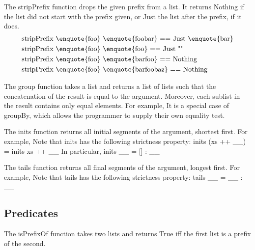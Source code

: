 \eqCode
\label{haskellBreak}


The stripPrefix function drops the given prefix from a list. It returns Nothing if the list did not start with the prefix given, or Just the list after the prefix, if it does.
\begin{align*}
	&\text{stripPrefix \enquote{foo} \enquote{foobar} == Just \enquote{bar}}\\
	&\text{stripPrefix \enquote{foo} \enquote{foo} == Just ""}\\
	&\text{stripPrefix \enquote{foo} \enquote{barfoo} == Nothing}\\
	&\text{stripPrefix \enquote{foo} \enquote{barfoobaz} == Nothing}
\end{align*}

The group function takes a list and returns a list of lists such that the concatenation of the result is equal to the argument. Moreover, each sublist in the result contains only equal elements. For example,
It is a special case of groupBy, which allows the programmer to supply their own equality test.

\eqCode
\label{haskellBreak}


The inits function returns all initial segments of the argument, shortest first. For example,
Note that inits has the following strictness property: inits (xs ++ \_\textbar\_) = inits xs ++ \_\textbar\_
In particular, inits \_\textbar\_ = [] : \_\textbar\_

The tails function returns all final segments of the argument, longest first. For example,
Note that tails has the following strictness property: tails \_\textbar\_ = \_\textbar\_ : \_\textbar\_

\subsection{Predicates}
The isPrefixOf function takes two lists and returns True iff the first list is a prefix of the second.

